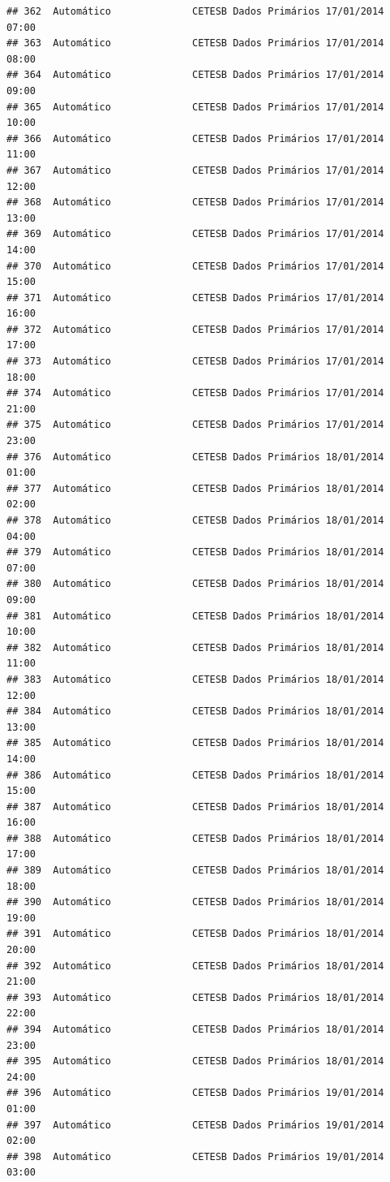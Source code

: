 \documentclass[]{book}
\begin{document}
\begin{verbatim}
## 362  Automático              CETESB Dados Primários 17/01/2014 07:00
## 363  Automático              CETESB Dados Primários 17/01/2014 08:00
## 364  Automático              CETESB Dados Primários 17/01/2014 09:00
## 365  Automático              CETESB Dados Primários 17/01/2014 10:00
## 366  Automático              CETESB Dados Primários 17/01/2014 11:00
## 367  Automático              CETESB Dados Primários 17/01/2014 12:00
## 368  Automático              CETESB Dados Primários 17/01/2014 13:00
## 369  Automático              CETESB Dados Primários 17/01/2014 14:00
## 370  Automático              CETESB Dados Primários 17/01/2014 15:00
## 371  Automático              CETESB Dados Primários 17/01/2014 16:00
## 372  Automático              CETESB Dados Primários 17/01/2014 17:00
## 373  Automático              CETESB Dados Primários 17/01/2014 18:00
## 374  Automático              CETESB Dados Primários 17/01/2014 21:00
## 375  Automático              CETESB Dados Primários 17/01/2014 23:00
## 376  Automático              CETESB Dados Primários 18/01/2014 01:00
## 377  Automático              CETESB Dados Primários 18/01/2014 02:00
## 378  Automático              CETESB Dados Primários 18/01/2014 04:00
## 379  Automático              CETESB Dados Primários 18/01/2014 07:00
## 380  Automático              CETESB Dados Primários 18/01/2014 09:00
## 381  Automático              CETESB Dados Primários 18/01/2014 10:00
## 382  Automático              CETESB Dados Primários 18/01/2014 11:00
## 383  Automático              CETESB Dados Primários 18/01/2014 12:00
## 384  Automático              CETESB Dados Primários 18/01/2014 13:00
## 385  Automático              CETESB Dados Primários 18/01/2014 14:00
## 386  Automático              CETESB Dados Primários 18/01/2014 15:00
## 387  Automático              CETESB Dados Primários 18/01/2014 16:00
## 388  Automático              CETESB Dados Primários 18/01/2014 17:00
## 389  Automático              CETESB Dados Primários 18/01/2014 18:00
## 390  Automático              CETESB Dados Primários 18/01/2014 19:00
## 391  Automático              CETESB Dados Primários 18/01/2014 20:00
## 392  Automático              CETESB Dados Primários 18/01/2014 21:00
## 393  Automático              CETESB Dados Primários 18/01/2014 22:00
## 394  Automático              CETESB Dados Primários 18/01/2014 23:00
## 395  Automático              CETESB Dados Primários 18/01/2014 24:00
## 396  Automático              CETESB Dados Primários 19/01/2014 01:00
## 397  Automático              CETESB Dados Primários 19/01/2014 02:00
## 398  Automático              CETESB Dados Primários 19/01/2014 03:00

\end{verbatim}
\end{document}
